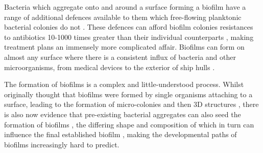 \documentclass[a4paper,12pt]{article}
\begin{document}
Bacteria which aggregate onto and around a surface forming a biofilm have a range of additional defences available to them which free-flowing planktonic bacterial 
colonies do not \cite{bioref:Lewis-biofilm-riddle-2001}.  These defences can afford biofilm colonies resistances to antibiotics 10-1000 times greater than their individual counterparts 
\cite{bioref:Anderson-innate-biofilm-resistances-2008}, making treatment plans an immensely more complicated affair.  Biofilms can form on almost any surface where there is a 
consistent influx of bacteria and other microorganisms, from medical devices \cite{bioref:Donlan-biofilms-medical-devices-2002} to the exterior of ship hulls 
\cite{bioref:Chambers-modern-antifoul-coatings-2006}.  

The formation of biofilms is a complex and little-understood process.  Whilst originally thought that biofilms were formed by single organisms attaching to a surface, leading to 
the formation of micro-colonies and then 3D structures \cite{bioref:Monds-biofilm-formation-2009}, there is also now evidence that pre-existing bacterial aggregates can also 
seed the formation of biofilms \cite{bioref:hall-stooley-biofilm-clumps-2005}, the differing shape and composition of which in turn can influence the final established biofilm 
\cite{bioref:Xavier-biofilm-framework-multiD-modelling-2005}, making the developmental paths of biofilms increasingly hard to predict.





% 
% 
% 
\end{document}
